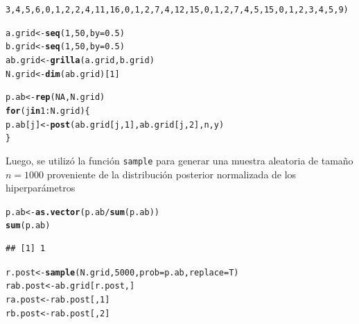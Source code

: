 \documentclass[10pt,openright]{book}\usepackage[]{graphicx}\usepackage[]{color}
\makeatletter
\newcommand{\hlnum}[1]{\textcolor[rgb]{0.686,0.059,0.569}{#1}}%
\newcommand{\hlopt}[1]{\textcolor[rgb]{0,0,0}{#1}}%
\newcommand{\hlstd}[1]{\textcolor[rgb]{0.345,0.345,0.345}{#1}}%
\newcommand{\hlkwa}[1]{\textcolor[rgb]{0.161,0.373,0.58}{\textbf{#1}}}%
\newcommand{\hlkwb}[1]{\textcolor[rgb]{0.69,0.353,0.396}{#1}}%
\newcommand{\hlkwc}[1]{\textcolor[rgb]{0.333,0.667,0.333}{#1}}%
\newcommand{\hlkwd}[1]{\textcolor[rgb]{0.737,0.353,0.396}{\textbf{#1}}}%
\newenvironment{kframe}{%
 \def\at@end@of@kframe{}%
 \ifinner\ifhmode%
  \def\at@end@of@kframe{\end{minipage}}%
  \begin{minipage}{\columnwidth}%
 \fi\fi%
 \def\FrameCommand##1{\hskip\@totalleftmargin \hskip-\fboxsep
 \colorbox{shadecolor}{##1}\hskip-\fboxsep
     \hskip-\linewidth \hskip-\@totalleftmargin \hskip\columnwidth}%
 \MakeFramed {\advance\hsize-\width
   \@totalleftmargin\z@ \linewidth\hsize
   \@setminipage}}%
 {\par\unskip\endMakeFramed%
 \at@end@of@kframe}
\newenvironment{knitrout}{}{} %
\makeatother
\begin{document}
\begin{knitrout}
\begin{kframe}
\begin{alltt}
      \hlnum{3}\hlstd{,}\hlnum{4}\hlstd{,}\hlnum{5}\hlstd{,}\hlnum{6}\hlstd{,}\hlnum{0}\hlstd{,}\hlnum{1}\hlstd{,}\hlnum{2}\hlstd{,}\hlnum{2}\hlstd{,}\hlnum{4}\hlstd{,}\hlnum{11}\hlstd{,}\hlnum{16}\hlstd{,}\hlnum{0}\hlstd{,}\hlnum{1}\hlstd{,}\hlnum{2}\hlstd{,}\hlnum{7}\hlstd{,}\hlnum{4}\hlstd{,}\hlnum{12}\hlstd{,}\hlnum{15}\hlstd{,}\hlnum{0}\hlstd{,}\hlnum{1}\hlstd{,}\hlnum{2}\hlstd{,}\hlnum{7}\hlstd{,}\hlnum{4}\hlstd{,}\hlnum{5}\hlstd{,}\hlnum{15}\hlstd{,}\hlnum{0}\hlstd{,}\hlnum{1}\hlstd{,}\hlnum{2}\hlstd{,}\hlnum{3}\hlstd{,}\hlnum{4}\hlstd{,}\hlnum{5}\hlstd{,}\hlnum{9}\hlstd{)}

 \hlstd{a.grid}\hlkwb{<-}\hlkwd{seq}\hlstd{(}\hlnum{1}\hlstd{,}\hlnum{50}\hlstd{,}\hlkwc{by}\hlstd{=}\hlnum{0.5}\hlstd{)}
 \hlstd{b.grid}\hlkwb{<-}\hlkwd{seq}\hlstd{(}\hlnum{1}\hlstd{,}\hlnum{50}\hlstd{,}\hlkwc{by}\hlstd{=}\hlnum{0.5}\hlstd{)}
 \hlstd{ab.grid}\hlkwb{<-}\hlkwd{grilla}\hlstd{(a.grid,b.grid)}
 \hlstd{N.grid}\hlkwb{<-}\hlkwd{dim}\hlstd{(ab.grid)[}\hlnum{1}\hlstd{]}

 \hlstd{p.ab} \hlkwb{<-} \hlkwd{rep}\hlstd{(}\hlnum{NA}\hlstd{, N.grid)}
 \hlkwa{for}\hlstd{(j} \hlkwa{in} \hlnum{1}\hlopt{:}\hlstd{N.grid)\{}
   \hlstd{p.ab[j]} \hlkwb{<-} \hlkwd{post}\hlstd{(ab.grid[j,}\hlnum{1}\hlstd{], ab.grid[j,}\hlnum{2}\hlstd{], n, y)}
 \hlstd{\}}
\end{alltt}
\end{kframe}
\end{knitrout}

Luego, se utiliz\'o la funci\'on \verb'sample' para generar una muestra aleatoria de tama\~no $n=1000$ proveniente de la distribuci\'on posterior normalizada de los hiperpar\'ametros
\begin{knitrout}
\color{fgcolor}\begin{kframe}
\begin{alltt}
 \hlstd{p.ab}\hlkwb{<-}\hlkwd{as.vector}\hlstd{(p.ab}\hlopt{/}\hlkwd{sum}\hlstd{(p.ab))}
 \hlkwd{sum}\hlstd{(p.ab)}
\end{alltt}
\begin{verbatim}
## [1] 1
\end{verbatim}
\begin{alltt}
 \hlstd{r.post}\hlkwb{<-}\hlkwd{sample}\hlstd{(N.grid,}\hlnum{5000}\hlstd{,}\hlkwc{prob}\hlstd{=p.ab,}\hlkwc{replace}\hlstd{=T)}
 \hlstd{rab.post}\hlkwb{<-}\hlstd{ab.grid[r.post,]}
 \hlstd{ra.post}\hlkwb{<-}\hlstd{rab.post[,}\hlnum{1}\hlstd{]}
 \hlstd{rb.post}\hlkwb{<-}\hlstd{rab.post[,}\hlnum{2}\hlstd{]}
\end{alltt}
\end{kframe}
\end{knitrout}
\end{document}
